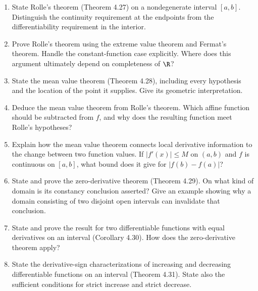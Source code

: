 \begin{enumerate}[resume]
  \item State Rolle's theorem (Theorem 4.27) on a nondegenerate
    interval \([a,b]\). Distinguish the continuity requirement at
    the endpoints from the differentiability requirement in the interior.

  \item Prove Rolle's theorem using the extreme value theorem and
    Fermat's theorem. Handle the constant-function case explicitly.
    Where does this argument ultimately depend on completeness of \(\R\)?

  \item State the mean value theorem (Theorem 4.28), including every
    hypothesis and the location of the point it supplies.
    Give its geometric interpretation.

  \item Deduce the mean value theorem from Rolle's theorem.
    Which affine function should be subtracted from \(f\), and
    why does the resulting function meet Rolle's hypotheses?

  \item Explain how the mean value theorem connects local derivative
    information to the change between two function values.
    If \(|f'(x)|\leq M\) on \((a,b)\) and \(f\) is continuous
    on \([a,b]\), what bound does it give for \(|f(b)-f(a)|\)?

  \item State and prove the zero-derivative theorem (Theorem 4.29).
    On what kind of domain is its constancy conclusion asserted?
    Give an example showing why a domain consisting of two disjoint
    open intervals can invalidate that conclusion.

  \item State and prove the result for two differentiable functions
    with equal derivatives on an interval (Corollary 4.30).
    How does the zero-derivative theorem apply?

  \item State the derivative-sign characterizations of increasing
    and decreasing differentiable functions on an interval
    (Theorem 4.31). State also the sufficient conditions for strict
    increase and strict decrease.


\end{enumerate}
